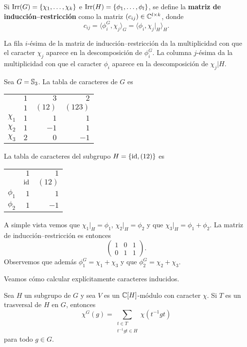 \begin{definition}
Si $\operatorname{Irr}(G)=\{\chi_1,\dots,\chi_k\}$ e $\operatorname{Irr}(H)=\{\phi_1,\dots,\phi_l\}$, se define
la \textbf{matriz de inducción--restricción} como la matriz $(c_{ij})\in\mathbb{C}^{l\times k}$, donde
\[
c_{ij}=\langle \phi_i^G,\chi_j\rangle_G=\langle\phi_i,\chi_j|_H\rangle_H.
\]
\end{definition}

La fila $i$-ésima de la matriz de inducción--restricción da la multiplicidad con que el caracter $\chi_j$ aparece
en la descomposición de $\phi_i^G$. La columna $j$-ésima da la multiplicidad con que el caracter $\phi_i$ aparece 
en la descomposición de $\chi_j|H$.

\begin{example}
Sea $G=\mathbb{S}_3$. 
La tabla de caracteres de $G$ es 
	\begin{center}
		\begin{tabular}{|c|rrr|}
			\hline
			& $1$ & $3$ & $2$\tabularnewline
			& $1$ & $(12)$ & $(123)$ \tabularnewline
			\hline 
			$\chi_{1}$ & $1$ & $1$ & $1$\tabularnewline
			$\chi_{2}$ & $1$ & $-1$ & $1$ \tabularnewline
			$\chi_{3}$ & $2$ & $0$ & $-1$ \tabularnewline
			\hline
		\end{tabular}
	\end{center}
La tabla de caracteres del subgrupo 
$H=\{\operatorname{id},(12)\}$ es 
\begin{center}
\begin{tabular}{|c|rr|}
\hline 
& $1$ & $1$ \tabularnewline
& $\operatorname{id}$ & $(12)$ \tabularnewline
\hline 
$\phi_{1}$ & $1$ & $1$ \tabularnewline
$\phi_{2}$ & $1$ & $-1$\tabularnewline
\hline
\end{tabular}
\end{center}
A simple vista vemos que $\chi_1|_H=\phi_1$, $\chi_2|_H=\phi_2$ y que $\chi_3|_H=\phi_1+\phi_2$. 
La matriz de inducción--restricción es entonces
\[
\begin{pmatrix}
1 & 0 & 1\\
0 & 1 & 1
\end{pmatrix}.
\]
Observemos que además $\phi_1^G=\chi_1+\chi_3$ y que $\phi_2^G=\chi_2+\chi_3$. 
\end{example}

Veamos cómo calcular explícitamente caracteres inducidos. 

\begin{proposition}
Sea $H$ un subgrupo de $G$ y sea $V$ es un $\mathbb{C}[H]$-módulo con caracter $\chi$. Si 
$T$ es un trasversal de $H$ en $G$, entonces
\[
\chi^G(g)=\sum_{\substack{t\in T\\t^{-1}gt\in H}}\chi(t^{-1}gt)
\]
para todo $g\in G$. 
\end{proposition}

